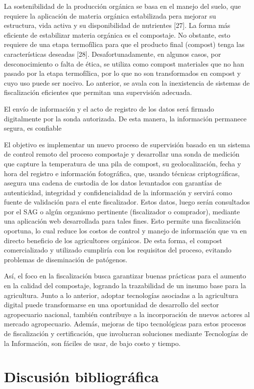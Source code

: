 \documentclass[12pt, letterpaper]{article}
\begin{document}
\par 
La sostenibilidad de la producción orgánica se basa en el manejo del suelo, que requiere la aplicación de materia orgánica estabilizada pera mejorar su estructura, vida activa y su disponibilidad de nutrientes [27]. La forma más eficiente de estabilizar materia orgánica es el compostaje. No obstante, esto requiere de una etapa termofílica para que el producto final (compost) tenga las características deseadas [28]. Desafortunadamente, en algunos casos, por desconocimiento o falta de ética, se utiliza como compost materiales que no han pasado por la etapa termofílica, por lo que no son transformados en compost y cuyo uso puede ser nocivo. Lo anterior, se avala con la inexistencia de sistemas de fiscalización eficientes que permitan una supervisión adecuada.
\par 
 El envío de información y el acto de registro de los datos será firmado digitalmente por la sonda autorizada. De esta manera, la información permanece segura, es confiable  
\par 
El objetivo es implementar un nuevo proceso de supervisión basado en un sistema de control remoto del proceso compostaje y desarrollar una sonda de medición que capture la temperatura de una pila de compost, su geolocalización, fecha y hora del registro e información fotográfica, que, usando técnicas criptográficas, asegura una cadena de custodia de los datos levantados con garantías de autenticidad, integridad y confidencialidad de la información y servirá como fuente de validación para el ente fiscalizador. Estos datos, luego serán consultados por el SAG o algún organismo pertinente (fiscalizador o comprador), mediante una aplicación web desarrollada para tales fines.
Esto permite una fiscalización oportuna, lo cual reduce los costos de control y manejo de información que va en directo beneficio de los agricultores orgánicos. De esta forma, el compost comercializado y utilizado cumpliría con los requisitos del proceso, evitando problemas de diseminación de patógenos.
\par 
Así, el foco en la fiscalización busca garantizar buenas prácticas para el aumento en la calidad del compostaje, logrando la trazabilidad de un insumo base para la agricultura. Junto a lo anterior, adoptar tecnologías asociadas a la agricultura digital puede transformarse en una oportunidad de desarrollo del sector agropecuario nacional, también contribuye a la incorporación de nuevos actores al mercado agropecuario. Además, mejoras de tipo tecnológicas para estos procesos de fiscalización y certificación, que involucran soluciones mediante Tecnologías de la Información, son fáciles de usar, de bajo costo y tiempo. 


\section{Discusión bibliográfica}
\end{document}
